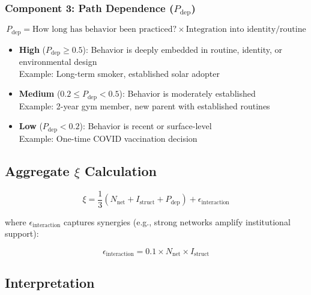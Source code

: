 \documentclass[11pt, a4paper]{article}
\begin{document}
\subsubsection{Component 3: Path Dependence ($P_{\text{dep}}$)}

\begin{equation}
P_{\text{dep}} = \text{How long has behavior been practiced?} \times \text{Integration into identity/routine}
\end{equation}

\begin{itemize}
    \item \textbf{High} ($P_{\text{dep}} \geq 0.5$):
    Behavior is deeply embedded in routine, identity, or environmental design
    \\ Example: Long-term smoker, established solar adopter

    \item \textbf{Medium} ($0.2 \leq P_{\text{dep}} < 0.5$):
    Behavior is moderately established
    \\ Example: 2-year gym member, new parent with established routines

    \item \textbf{Low} ($P_{\text{dep}} < 0.2$):
    Behavior is recent or surface-level
    \\ Example: One-time COVID vaccination decision
\end{itemize}

\subsection{Aggregate $\xi$ Calculation}

\begin{equation}
\xi = \frac{1}{3}(N_{\text{net}} + I_{\text{struct}} + P_{\text{dep}}) + \epsilon_{\text{interaction}}
\end{equation}

\noindent
where $\epsilon_{\text{interaction}}$ captures synergies (e.g., strong networks
amplify institutional support):

\begin{equation}
\epsilon_{\text{interaction}} = 0.1 \times N_{\text{net}} \times I_{\text{struct}}
\end{equation}

\subsection{Interpretation}
\end{document}

